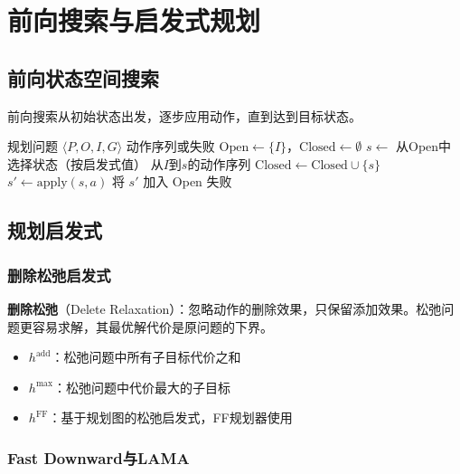 \section{前向搜索与启发式规划}

\subsection{前向状态空间搜索}

前向搜索从初始状态出发，逐步应用动作，直到达到目标状态。

\begin{algorithm}[htbp]
\caption{前向状态空间搜索}
\begin{algorithmic}[1]
\Require 规划问题 $\langle P, O, I, G \rangle$
\Ensure 动作序列或失败
\State $\text{Open} \gets \{I\}$，$\text{Closed} \gets \emptyset$
  \State $s \gets$ 从Open中选择状态（按启发式值）
    \State \Return 从$I$到$s$的动作序列
  \EndIf
  \State $\text{Closed} \gets \text{Closed} \cup \{s\}$
    \State $s' \gets \text{apply}(s, a)$
      \State 将 $s'$ 加入 Open
    \EndIf
  \EndFor
\EndWhile
\State \Return 失败
\end{algorithmic}
\end{algorithm}

\subsection{规划启发式}

\subsubsection{删除松弛启发式}

\textbf{删除松弛}（Delete Relaxation）：忽略动作的删除效果，只保留添加效果。松弛问题更容易求解，其最优解代价是原问题的下界。

\begin{itemize}[leftmargin=2em]
  \item $h^{\text{add}}$：松弛问题中所有子目标代价之和
  \item $h^{\text{max}}$：松弛问题中代价最大的子目标
  \item $h^{\text{FF}}$：基于规划图的松弛启发式，FF规划器使用
\end{itemize}

\subsubsection{Fast Downward与LAMA}

